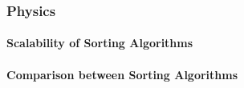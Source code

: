 \clearpage

\subsubsection{Physics}

\paragraph{Scalability of Sorting Algorithms}
\paragraph{Comparison between Sorting Algorithms}
